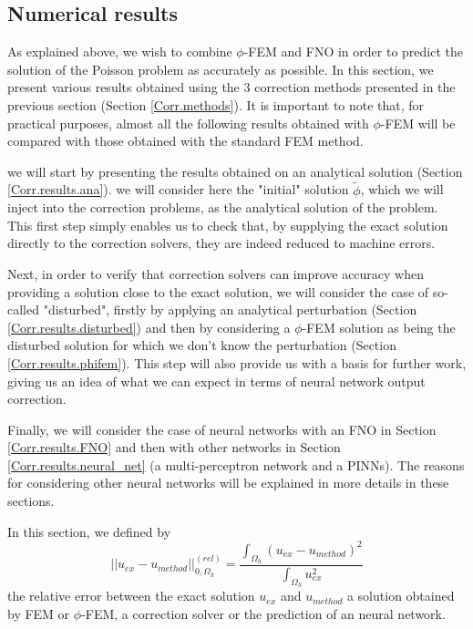 \subsection{Numerical results} \label{Corr.results}

As explained above, we wish to combine $\phi$-FEM and FNO in order to predict the solution of the Poisson problem as accurately as possible. In this section, we present various results obtained using the 3 correction methods presented in the previous section (Section \ref{Corr.methods}). It is important to note that, for practical purposes, almost all the following results obtained with $\phi$-FEM will be compared with those obtained with the standard FEM method.

we will start by presenting the results obtained on an analytical solution (Section \ref{Corr.results.ana}). we will consider here the "initial" solution $\tilde{\phi}$, which we will inject into the correction problems, as the analytical solution of the problem. This first step simply enables us to check that, by supplying the exact solution directly to the correction solvers, they are indeed reduced to machine errors.

Next, in order to verify that correction solvers can improve accuracy when providing a solution close to the exact solution, we will consider the case of so-called "disturbed", firstly by applying an analytical perturbation (Section \ref{Corr.results.disturbed}) and then by considering a $\phi$-FEM solution as being the disturbed solution for which we don't know the perturbation (Section \ref{Corr.results.phifem}). This step will also provide us with a basis for further work, giving us an idea of what we can expect in terms of neural network output correction.

Finally, we will consider the case of neural networks with an FNO in Section \ref{Corr.results.FNO} and then with other networks in Section \ref{Corr.results.neural_net} (a multi-perceptron network and a PINNs). The reasons for considering other neural networks will be explained in more details in these sections.

In this section, we defined by
\begin{equation*}
	||u_{ex}-u_{method}||_{0,\Omega_h}^{(rel)}=\frac{\int_{\Omega_h} (u_{ex}-u_{method})^2}{\int_{\Omega_h} u_{ex}^2}
\end{equation*}
the relative error between the exact solution $u_{ex}$ and $u_{method}$ a solution obtained by FEM or $\phi$-FEM, a correction solver or the prediction of an neural network.

